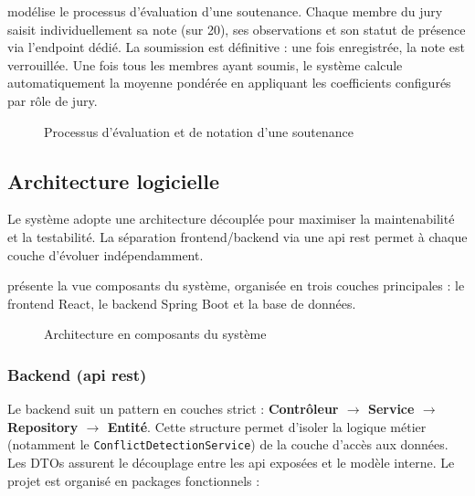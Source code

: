  modélise le processus d'évaluation d'une soutenance. Chaque membre du jury saisit individuellement sa note (sur 20), ses observations et son statut de présence via l'endpoint dédié. La soumission est définitive : une fois enregistrée, la note est verrouillée. Une fois tous les membres ayant soumis, le système calcule automatiquement la moyenne pondérée en appliquant les coefficients configurés par rôle de jury.

\begin{figure}[H]
    \centering
    \caption{Processus d'évaluation et de notation d'une soutenance}
    \label{fig:act_evaluation}
\end{figure}

\subsection{Architecture logicielle}
\label{ch3:architecture_logicielle}

Le système adopte une architecture découplée pour maximiser la maintenabilité et la testabilité. La séparation frontend/backend via une \acrshort{api} \acrshort{rest} permet à chaque couche d'évoluer indépendamment.

 présente la vue composants du système, organisée en trois couches principales : le frontend React, le backend Spring Boot et la base de données.

\begin{figure}[H]
    \centering
    \caption{Architecture en composants du système}
    \label{fig:component_architecture}
\end{figure}

\subsubsection{Backend (\acrshort{api} \acrshort{rest})}
Le backend suit un pattern en couches strict : \textbf{Contrôleur $\rightarrow$ Service $\rightarrow$ Repository $\rightarrow$ Entité}. Cette structure permet d'isoler la logique métier (notamment le \texttt{ConflictDetectionService}) de la couche d'accès aux données. Les DTOs assurent le découplage entre les \acrshort{api} exposées et le modèle interne. Le projet est organisé en  packages fonctionnels :

